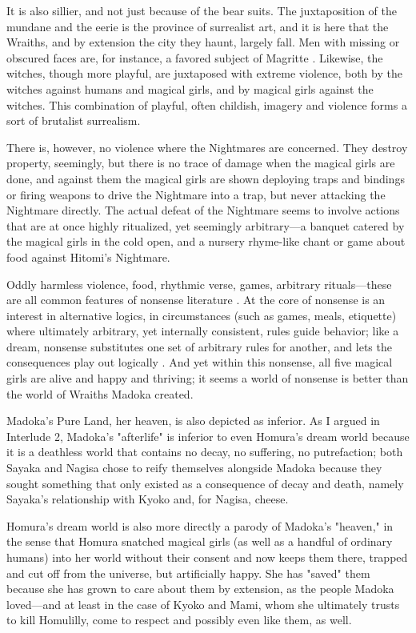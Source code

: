 It is also sillier, and not just because of the bear suits. The juxtaposition of the mundane and the eerie is the province of surrealist art, and it is here that the Wraiths, and by extension the city they haunt, largely fall. Men with missing or obscured faces are, for instance, a favored subject of Magritte \cite{ref116}. Likewise, the witches, though more playful, are juxtaposed with extreme violence, both by the witches against humans and magical girls, and by magical girls against the witches. This combination of playful, often childish, imagery and violence forms a sort of brutalist surrealism. 

There is, however, no violence where the Nightmares are concerned. They destroy property, seemingly, but there is no trace of damage when the magical girls are done, and against them the magical girls are shown deploying traps and bindings or firing weapons to drive the Nightmare into a trap, but never attacking the Nightmare directly. The actual defeat of the Nightmare seems to involve actions that are at once highly ritualized, yet seemingly arbitrary—a banquet catered by the magical girls in the cold open, and a nursery rhyme-like chant or game about food against Hitomi's Nightmare. 

Oddly harmless violence, food, rhythmic verse, games, arbitrary rituals—these are all common features of nonsense literature \cite{ref117}. At the core of nonsense is an interest in alternative logics, in circumstances (such as games, meals, etiquette) where ultimately arbitrary, yet internally consistent, rules guide behavior; like a dream, nonsense substitutes one set of arbitrary rules for another, and lets the consequences play out logically \cite{ref118}. And yet within this nonsense, all five magical girls are alive and happy and thriving; it seems a world of nonsense is better than the world of Wraiths Madoka created. 

Madoka's Pure Land, her heaven, is also depicted as inferior. As I argued in Interlude 2, Madoka's "afterlife" is inferior to even Homura's dream world because it is a deathless world that contains no decay, no suffering, no putrefaction; both Sayaka and Nagisa chose to reify themselves alongside Madoka because they sought something that only existed as a consequence of decay and death, namely Sayaka's relationship with Kyoko and, for Nagisa, cheese. 

Homura's dream world is also more directly a parody of Madoka's "heaven," in the sense that Homura snatched magical girls (as well as a handful of ordinary humans) into her world without their consent and now keeps them there, trapped and cut off from the universe, but artificially happy. She has "saved" them because she has grown to care about them by extension, as the people Madoka loved—and at least in the case of Kyoko and Mami, whom she ultimately trusts to kill Homulilly, come to respect and possibly even like them, as well.

